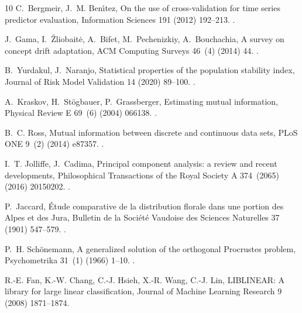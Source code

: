 \documentclass[preprint,12pt]{elsarticle}
\begin{document}
\begin{thebibliography}{10}
C.~Bergmeir, J.~M. Ben{\'\i}tez, On the use of cross-validation for time series
  predictor evaluation, Information Sciences 191 (2012) 192--213.
\newblock \href {https://doi.org/10.1016/j.ins.2011.12.028}
  {}.

J.~Gama, I.~{\v{Z}}liobait{\.e}, A.~Bifet, M.~Pechenizkiy, A.~Bouchachia, A
  survey on concept drift adaptation, ACM Computing Surveys 46~(4) (2014) 44.
\newblock \href {https://doi.org/10.1145/2523813} {}.

B.~Yurdakul, J.~Naranjo, Statistical properties of the population stability
  index, Journal of Risk Model Validation 14 (2020) 89--100.
\newblock \href {https://doi.org/10.21314/JRMV.2020.227}
  {}.

A.~Kraskov, H.~St{\"o}gbauer, P.~Grassberger, Estimating mutual information,
  Physical Review E 69~(6) (2004) 066138.
\newblock \href {https://doi.org/10.1103/PhysRevE.69.066138}
  {}.

B.~C. Ross, Mutual information between discrete and continuous data sets, PLoS
  ONE 9~(2) (2014) e87357.
\newblock \href {https://doi.org/10.1371/journal.pone.0087357}
  {}.

I.~T. Jolliffe, J.~Cadima, Principal component analysis: a review and recent
  developments, Philosophical Transactions of the Royal Society A 374~(2065)
  (2016) 20150202.
\newblock \href {https://doi.org/10.1098/rsta.2015.0202}
  {}.

P.~Jaccard, {\'E}tude comparative de la distribution florale dans une portion
  des {A}lpes et des {J}ura, Bulletin de la Soci{\'e}t{\'e} Vaudoise des
  Sciences Naturelles 37 (1901) 547--579.
\newblock \href {https://doi.org/10.5169/seals-266450}
  {}.

P.~H. Sch{\"o}nemann, A generalized solution of the orthogonal {P}rocrustes
  problem, Psychometrika 31~(1) (1966) 1--10.
\newblock \href {https://doi.org/10.1007/BF02289451}
  {}.

R.-E. Fan, K.-W. Chang, C.-J. Hsieh, X.-R. Wang, C.-J. Lin, {LIBLINEAR}: A
  library for large linear classification, Journal of Machine Learning Research
  9 (2008) 1871--1874.


\end{thebibliography}
\end{document}
